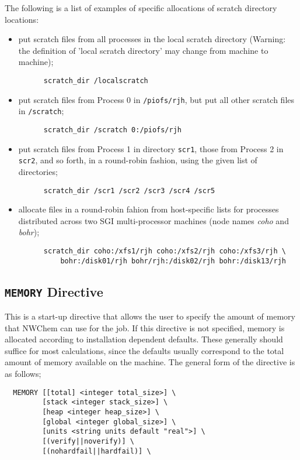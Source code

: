 The following is a list of examples of specific allocations of scratch
directory locations:
\begin{itemize}
\item put scratch files from all processes in the local scratch directory 
(Warning: the definition of 'local scratch directory' may change from 
machine to machine);
\begin{verbatim}
      scratch_dir /localscratch
\end{verbatim}
\item put scratch files from Process 0 in \verb+/piofs/rjh+, but put all 
other scratch files in \verb+/scratch+;
\begin{verbatim}
      scratch_dir /scratch 0:/piofs/rjh
\end{verbatim}
\item put scratch files from Process 1 in directory \verb+scr1+, those from
Process 2 in \verb+scr2+, and so forth, in a round-robin fashion, using the
given list of directories;
\begin{verbatim}
      scratch_dir /scr1 /scr2 /scr3 /scr4 /scr5
\end{verbatim}
\item allocate files in a round-robin fahion from
  host-specific lists for processes distributed across two
 SGI multi-processor machines (node names {\it coho} and {\it bohr});
\begin{verbatim}
      scratch_dir coho:/xfs1/rjh coho:/xfs2/rjh coho:/xfs3/rjh \
          bohr:/disk01/rjh bohr/rjh:/disk02/rjh bohr:/disk13/rjh
\end{verbatim}
\end{itemize}

\subsection{{\tt MEMORY} Directive}

This is a start-up directive that allows the user to specify the
amount of memory that NWChem can use for the job.  If this directive
is not specified, memory is allocated according to installation
dependent defaults.  These generally should suffice for most
calculations, since the defaults usually correspond to the total amount
of memory available on the machine.  The general form of the directive
is as follows;

\begin{verbatim}
  MEMORY [[total] <integer total_size>] \
         [stack <integer stack_size>] \
         [heap <integer heap_size>] \
         [global <integer global_size>] \
         [units <string units default "real">] \
         [(verify||noverify)] \
         [(nohardfail||hardfail)] \
\end{verbatim}

